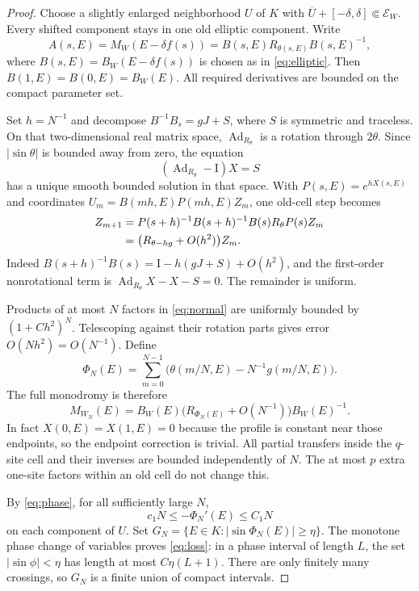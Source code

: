 \documentclass[11pt,a4paper]{article}
\numberwithin{equation}{section}
\theoremstyle{remark}
\newcommand{\Id}{\mathrm I}
\newcommand{\Ad}{\operatorname{Ad}}
\begin{document}
\begin{proof}
Choose a slightly enlarged neighborhood $U$ of $K$ with
$\overline U+[-\delta,\delta]\Subset\mathcal E_W$.
Every shifted component stays in one old elliptic component.
Write
\[
A(s,E)=M_W(E-\delta f(s))
=B(s,E)R_{\theta(s,E)}B(s,E)^{-1},
\]
where $B(s,E)=B_W(E-\delta f(s))$ is chosen as in
\eqref{eq:elliptic}. Then $B(1,E)=B(0,E)=B_W(E)$.
All required derivatives are bounded on the compact parameter set.

Set $h=N^{-1}$ and decompose $B^{-1}B_s=gJ+S$, where $S$
is symmetric and traceless. On that two-dimensional real
matrix space, $\Ad_{R_\theta}$ is a rotation through $2\theta$.
Since $|\sin\theta|$ is bounded away from zero, the equation
\[
(\Ad_{R_\theta}-\Id)X=S
\]
has a unique smooth bounded solution in that space.
With $P(s,E)=e^{hX(s,E)}$ and coordinates
$U_m=B(mh,E)P(mh,E)Z_m$, one old-cell step becomes
\begin{align}
Z_{m+1}
&=P(s+h)^{-1}B(s+h)^{-1}B(s)R_\theta P(s)Z_m\notag\\
&=\bigl(R_{\theta-hg}+O(h^2)\bigr)Z_m.
\label{eq:normal}
\end{align}
Indeed $B(s+h)^{-1}B(s)=\Id-h(gJ+S)+O(h^2)$,
and the first-order nonrotational term is
$\Ad_{R_\theta}X-X-S=0$. The remainder is uniform.

Products of at most $N$ factors in \eqref{eq:normal}
are uniformly bounded by $(1+Ch^2)^N$. Telescoping against
their rotation parts gives error $O(Nh^2)=O(N^{-1})$.
Define
\[
\Phi_N(E)=\sum_{m=0}^{N-1}
\bigl(\theta(m/N,E)-N^{-1}g(m/N,E)\bigr).
\]
The full monodromy is therefore
\begin{equation}\label{eq:full}
M_{W_N}(E)
=B_W(E)\bigl(R_{\Phi_N(E)}+O(N^{-1})\bigr)B_W(E)^{-1}.
\end{equation}
In fact $X(0,E)=X(1,E)=0$ because the profile is constant
near those endpoints, so the endpoint correction is trivial.
All partial transfers inside the $q$-site cell and their inverses
are bounded independently of $N$. The at most $p$ extra
one-site factors within an old cell do not change this.

By \eqref{eq:phase}, for all sufficiently large $N$,
\[
c_1N\le-\Phi_N'(E)\le C_1N
\]
on each component of $U$. Set
$G_N=\{E\in K:|\sin\Phi_N(E)|\ge\eta\}$.
The monotone phase change of variables proves \eqref{eq:loss}:
in a phase interval of length $L$, the set $|\sin\phi|<\eta$
has length at most $C\eta(L+1)$. There are only finitely many
crossings, so $G_N$ is a finite union of compact intervals.


\end{proof}
\end{document}
